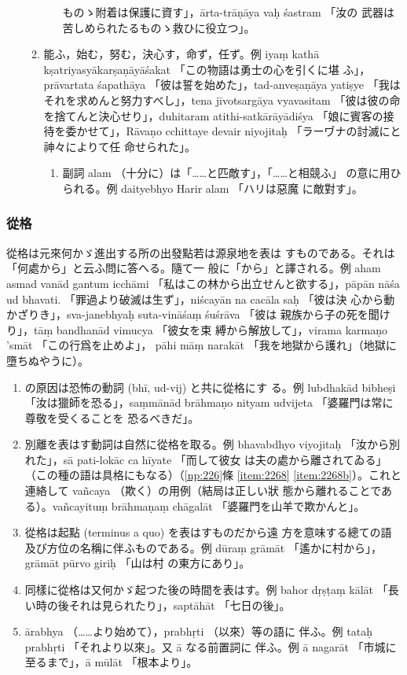 \begin{enumerate}[label=(\Alph*)]
\begin{enumerate}[label=(\arabic*)]
\begin{enumerate}[label=(\alph*)]
ものゝ附着は保護に資す」，ārta-trāṇāya vaḥ śastram 「汝の
武器は苦しめられたるものゝ救ひに役立つ」。
\end{enumerate}
\item 能ふ，始む，努む，決心す，命ず，任ず。例 iyaṃ kathā
kṣatriyasyākarṣaṇāyāśakat 「この物語は勇士の心を引くに堪
ふ」，prāvartata śapathāya 「彼は誓を始めた」，tad-anveṣaṇāya
yatiṣye 「我はそれを求めんと努力すべし」，tena jīvotsargāya
vyavasitam 「彼は彼の命を捨てんと決心せり」，duhitaram
atithi-satkārāyādiśya 「娘に賓客の接待を委かせて」，Rāvaṇo\-%
cchittaye devair niyojitaḥ 「ラーヷナの討滅にと神々によりて任
命せられた」。
\begin{enumerate}[label=(\alph*)]
\item 副詞 alam （十分に）は「……と匹敵す」，「……と相競ふ」
の意に用ひられる。例 daityebhyo Harir alam 「ハリは惡魔
に敵對す」。
\end{enumerate}
\end{enumerate}
\end{enumerate}

\subsubsection{從格}
\numberParagraph
從格は元來何かゞ進出する所の出發點若は源泉地を表は
すものである。それは「何處から」と云ふ問に答へる。隨て一
般に「から」と譯される。例 aham asmad vanād gantum
icchāmi 「私はこの林から出立せんと欲する」，pāpān nāśa ud\-%
bhavati. 「罪過より破滅は生ず」，niścayān na cacāla saḥ 「彼は決
心から動かざりき」，sva-janebhyaḥ suta-vināśaṃ śuśrāva 「彼は
親族から子の死を聞けり」，tāṃ bandhanād vimucya 「彼女を束
縛から解放して」，virama karmaṇo 'smāt 「この行爲を止めよ」，
pāhi māṃ narakāt 「我を地獄から護れ」（地獄に墮ちぬやうに）。
\begin{enumerate}[label=(\alph*)]
\item {}の原因は恐怖の動詞 (bhī, ud-vij) と共に從格にす
る。例 lubdhakād bibheṣi 「汝は獵師を恐る」，saṃmānād
brāhmaṇo nityam udvijeta 「婆羅門は常に尊敬を受くることを
恐るべきだ」。
\item 別離を表はす動詞は自然に從格を取る。例 bhavabdhyo
viyojitaḥ 「汝から別れた」，sā pati-lokāc ca hīyate 「而して彼女
は夫の處から離されてゐる」（この種の語は具格にもなる）（\ref{np:226}條
\ref{item:2268} \ref{item:2268b}）。これと連絡して vañcaya （欺く）の用例（結局は正しい狀
態から離れることである）。vañcayituṃ brāhmaṇaṃ chāgalāt
「婆羅門を山羊で欺かんと」。
\item 從格は起點 (terminus a quo) を表はすものだから遠
方を意味する總ての語及び方位の名稱に伴ふものである。例
dūraṃ grāmāt 「遙かに村から」，grāmāt pūrvo giriḥ 「山は村
の東方にあり」。
\item 同樣に從格は又何かゞ起つた後の時間を表はす。例
bahor dṛṣṭaṃ kālāt 「長い時の後それは見られたり」，saptāhāt
「七日の後」。
\item ārabhya （……より始めて），prabhṛti （以來）等の語に
伴ふ。例 tataḥ prabhṛti 「それより以來」。又 ā なる前置詞に
伴ふ。例 ā nagarāt 「市城に至るまで」，ā mūlāt 「根本より」。
\end{enumerate}


